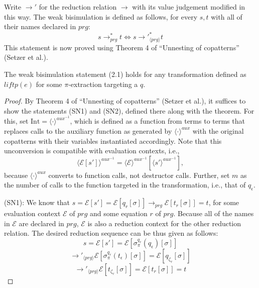 Write $\longrightarrow'$ for the reduction relation $\longrightarrow$ with its value judgement modified in this way. The weak bisimulation is defined as follows, for every $s,t$ with all of their names declared in $prg$:
\begin{equation}
s \longrightarrow_{prg}^* t \iff s {\longrightarrow'}_{\langle prg \rangle}^* t
\end{equation}
This statement is now proved using Theorem 4 of ``Unnesting of copatterns'' (Setzer et al.).

\begin{proposition}
The weak bisimulation statement (2.1) holds for any transformation defined as $liftp(e)$ for some $\pi$-extraction targeting a $q$.

\begin{proof}
By Theorem 4 of ``Unnesting of copatterns'' (Setzer et al.), it suffices to show the statements (SN1) and (SN2), defined there along with the theorem. For this, set $\textrm{Int} = \langle \cdot \rangle^{aux^{-1}}$, which is defined as a function from terms to terms that replaces calls to the auxiliary function as generated by $\langle \cdot \rangle^{aux}$ with the original copatterns with their variables instantiated accordingly. Note that this unconversion is compatible with evaluation contexts, i.e.,
\[
\langle \mathcal{E}[s'] \rangle^{aux^{-1}} = \langle \mathcal{E} \rangle^{aux^{-1}}[\langle s' \rangle^{aux^{-1}}],
\]
because $\langle \cdot \rangle^{aux}$ converts to function calls, not destructor calls.
Further, set $m$ as the number of calls to the function targeted in the transformation, i.e., that of $q_\epsilon$.

(SN1): We know that $s = \mathcal{E}[s'] = \mathcal{E}[q_r[\sigma]] \longrightarrow_{prg} \mathcal{E}[t_r[\sigma]] = t$, for some evaluation context $\mathcal{E}$ of $prg$ and some equation $r$ of $prg$. Because all of the names in $\mathcal{E}$ are declared in $prg$, $\mathcal{E}$ is also a reduction context for the other reduction relation. The desired reduction sequence can be thus given as follows:
\[
s = \mathcal{E}[s'] = \mathcal{E}[\sigma^{q_r}_\pi(q_\epsilon)[\sigma]]
\]
\[
\longrightarrow'_{\langle prg \rangle} \mathcal{E}[\sigma^{q_r}_\pi(t_\epsilon)[\sigma]] = \mathcal{E}[q_{\zeta_r}[\sigma]]
\]
\[
\longrightarrow'_{\langle prg \rangle} \mathcal{E}[t_{\zeta_r}[\sigma]] = \mathcal{E}[t_r[\sigma]] = t
\]


\end{proof}
\end{proposition}
